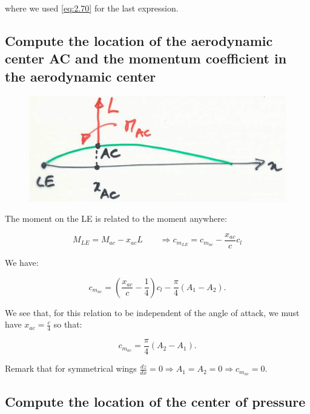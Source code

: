 \documentclass[british,french,11pt, a4paper, openany]{article}
\begin{document}
where we used \eqref{eq:2.70} for the last expression.

\subsection{Compute the location of the aerodynamic center AC and the momentum coefficient in the aerodynamic center}

\begin{figure}
	\vspace{-5mm}
	\includegraphics[scale=0.1]{ch2/35}
\end{figure}
The moment on the LE is related to the moment anywhere:

\begin{equation}
M_{LE} = M_{ac} - x_{ac} L \qquad \Rightarrow c_{m_{LE}} =c_{m_{ac}} - \frac{x_{ac}}{c}c_{l} 
\end{equation}

We have: 

\begin{equation}
c_{m_{ac}} = \left( \frac{x_{ac}}{c} - \frac{1}{4} \right) c_l - \frac{\pi}{4} (A_1 -A_2).
\end{equation}

We see that, for this relation to be independent of the angle of attack, we must have $x_{ac} = \frac{c}{4}$ so that: 

\begin{equation}
c_{m_{ac}} = \frac{\pi}{4} (A_2 - A_1).
\label{eq:2.77}
\end{equation}

Remark that for symmetrical wings $\frac{dz}{dx} = 0 \Rightarrow A_1 = A_2 = 0 \Rightarrow c_{m_{ac}} = 0$. 

\subsection{Compute the location of the center of pressure}
\end{document}
